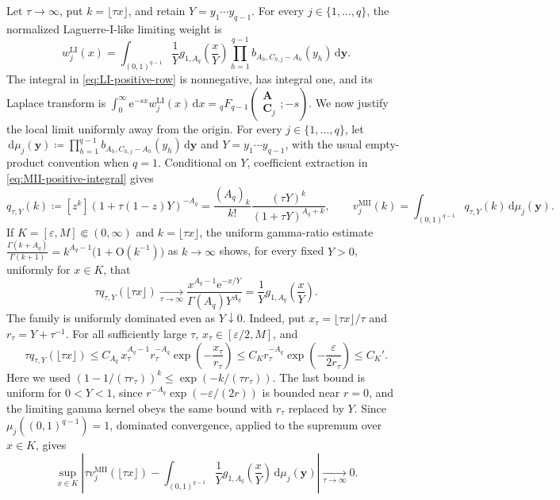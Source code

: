 \documentclass[10pt]{amsart}
\newcommand{\e}{\mathrm e}
\newcommand{\dd}{\,\mathrm d}
\newcommand{\A}{\boldsymbol A}
\newcommand{\pFq}[5]{{}_{#1}F_{#2}\!\left(\begin{matrix}#3\\#4\end{matrix};#5\right)}
\theoremstyle{plain}
\theoremstyle{definition}
\theoremstyle{remark}
\begin{document}
Let \(\tau\to\infty\), put \(k=\lfloor\tau x\rfloor\), and retain
\(Y=y_1\cdots y_{q-1}\). For every \(j\in\{1,\ldots,q\}\), the
normalized Laguerre-I-like limiting weight is
\begin{equation}
 w_j^{\mathrm{LI}}(x)
 =\int_{(0,1)^{q-1}}
 \frac1Y g_{1,A_q}\!\left(\frac{x}{Y}\right)
 \prod_{h=1}^{q-1}b_{A_h,C_{h,j}-A_h}(y_h)\dd\boldsymbol y.
 \label{eq:LI-positive-row}
\end{equation}
The integral in \eqref{eq:LI-positive-row} is nonnegative, has integral
one, and its Laplace transform is
\(\int_0^\infty\e^{-sx}w_j^{\mathrm{LI}}(x)\dd x
=\pFq{q}{q-1}{\A}{\boldsymbol C_j}{-s}\).
We now justify the local limit uniformly away from the origin. For every
\(j\in\{1,\ldots,q\}\), let
\(\dd\mu_j(\boldsymbol y)
\coloneq\prod_{h=1}^{q-1}b_{A_h,C_{h,j}-A_h}(y_h)\dd\boldsymbol y\)
and \(Y=y_1\cdots y_{q-1}\),
with the usual empty-product convention when \(q=1\). Conditional on
\(Y\), coefficient extraction in \eqref{eq:MII-positive-integral} gives
\[
 q_{\tau,Y}(k)
 \coloneq[z^k](1+\tau(1-z)Y)^{-A_q}
 =\frac{(A_q)_k}{k!}
   \frac{(\tau Y)^k}{(1+\tau Y)^{A_q+k}},
 \qquad
 v_j^{\mathrm{MII}}(k)
 =\int_{(0,1)^{q-1}} q_{\tau,Y}(k)\dd\mu_j(\boldsymbol y).
\]
If \(K=[\varepsilon,M]\Subset(0,\infty)\) and
\(k=\lfloor\tau x\rfloor\), the uniform gamma-ratio estimate
\(\frac{\Gamma(k+A_q)}{\Gamma(k+1)}
=k^{A_q-1}\bigl(1+\mathrm O(k^{-1})\bigr)\) as \(k\to\infty\)
shows, for every fixed \(Y>0\), uniformly for \(x\in K\), that
\[
 \tau q_{\tau,Y}(\lfloor\tau x\rfloor)
 \xrightarrow[\tau\to\infty]{}
 \frac{x^{A_q-1}\e^{-x/Y}}{\Gamma(A_q)Y^{A_q}}
 =\frac1Yg_{1,A_q}\!\left(\frac{x}{Y}\right).
\]
The family is uniformly dominated even as \(Y\downarrow0\). Indeed, put
\(x_\tau=\lfloor\tau x\rfloor/\tau\) and
\(r_\tau=Y+\tau^{-1}\). For all sufficiently large \(\tau\),
\(x_\tau\in[\varepsilon/2,M]\), and
\[
 \tau q_{\tau,Y}(\lfloor\tau x\rfloor)
 \le C_{A_q}\,x_\tau^{A_q-1}r_\tau^{-A_q}
 \exp\!\left(-\frac{x_\tau}{r_\tau}\right)
 \le C_Kr_\tau^{-A_q}
 \exp\!\left(-\frac{\varepsilon}{2r_\tau}\right)
 \le C_K'.
\]
Here we used
\((1-1/(\tau r_\tau))^k\le
\exp(-k/(\tau r_\tau))\). The last bound is uniform for
\(0<Y<1\), since \(r^{-A_q}\exp(-\varepsilon/(2r))\) is bounded
near \(r=0\), and the limiting gamma kernel obeys the same bound with
\(r_\tau\) replaced by \(Y\). Since
\(\mu_j((0,1)^{q-1})=1\),
dominated convergence, applied to the supremum over \(x\in K\), gives
\[
 \sup_{x\in K}\left|
 \tau v_j^{\mathrm{MII}}(\lfloor\tau x\rfloor)
 -\int_{(0,1)^{q-1}}\frac1Yg_{1,A_q}\!\left(\frac{x}{Y}\right)
       \dd\mu_j(\boldsymbol y)\right|
 \xrightarrow[\tau\to\infty]{}0.
\]
\end{document}
